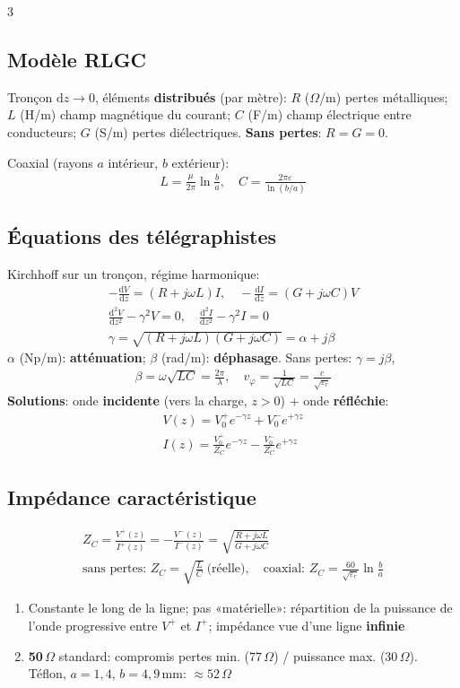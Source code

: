 \documentclass[12pt, a4paper]{article}
\newcommand{\dd}{\mathrm{d}}
\begin{document}
\begin{multicols*}{3}
	\subsection{Modèle RLGC}
	Tronçon $\dd z\to0$, éléments \textbf{distribués} (par mètre): $R$ ($\Omega$/m) pertes métalliques; $L$ (H/m) champ magnétique du courant; $C$ (F/m) champ électrique entre conducteurs; $G$ (S/m) pertes diélectriques. \textbf{Sans pertes}: $R=G=0$.

	Coaxial (rayons $a$ intérieur, $b$ extérieur):
	\begin{gather*}
		L=\frac{\mu}{2\pi}\ln\frac ba,\quad C=\frac{2\pi\varepsilon}{\ln(b/a)}
	\end{gather*}

	\subsection{Équations des télégraphistes}
	Kirchhoff sur un tronçon, régime harmonique:
	\begin{gather*}
		-\frac{\dd V}{\dd z}=(R+j\omega L)I,\quad-\frac{\dd I}{\dd z}=(G+j\omega C)V\\
		\frac{\dd^2V}{\dd z^2}-\gamma^2V=0,\quad\frac{\dd^2I}{\dd z^2}-\gamma^2I=0\\
		\gamma=\sqrt{(R+j\omega L)(G+j\omega C)}=\alpha+j\beta
	\end{gather*}
	$\alpha$ (Np/m): \textbf{atténuation}; $\beta$ (rad/m): \textbf{déphasage}. Sans pertes: $\gamma=j\beta$,
	\begin{gather*}
		\beta=\omega\sqrt{LC}=\frac{2\pi}{\lambda},\quad v_\varphi=\frac1{\sqrt{LC}}=\frac{c}{\sqrt{\varepsilon_r}}
	\end{gather*}
	\textbf{Solutions}: onde \textbf{incidente} (vers la charge, $z>0$) + onde \textbf{réfléchie}:
	\begin{gather*}
		V(z)=V_0^+e^{-\gamma z}+V_0^-e^{+\gamma z}\\
		I(z)=\frac{V_0^+}{Z_C}e^{-\gamma z}-\frac{V_0^-}{Z_C}e^{+\gamma z}
	\end{gather*}

	\colbreak
	\subsection{Impédance caractéristique}
	\begin{gather*}
		Z_C=\frac{V^+(z)}{I^+(z)}=-\frac{V^-(z)}{I^-(z)}=\sqrt{\frac{R+j\omega L}{G+j\omega C}}\\
		\text{sans pertes: }Z_C=\sqrt{\frac LC}\ \text{(réelle)},\quad\text{coaxial: }Z_C=\frac{60}{\sqrt{\varepsilon_r}}\ln\frac ba
	\end{gather*}
	\begin{enumerate}[\roman*.]
		\item Constante le long de la ligne; pas «matérielle»: répartition de la puissance de l'onde progressive entre $V^+$ et $I^+$; impédance vue d'une ligne \textbf{infinie}
		\item \textbf{50\,$\Omega$} standard: compromis pertes min. (77\,$\Omega$) / puissance max. (30\,$\Omega$). Téflon, $a=1{,}4$, $b=4{,}9$\,mm: $\approx52\,\Omega$
	\end{enumerate}


\end{multicols*}
\end{document}
